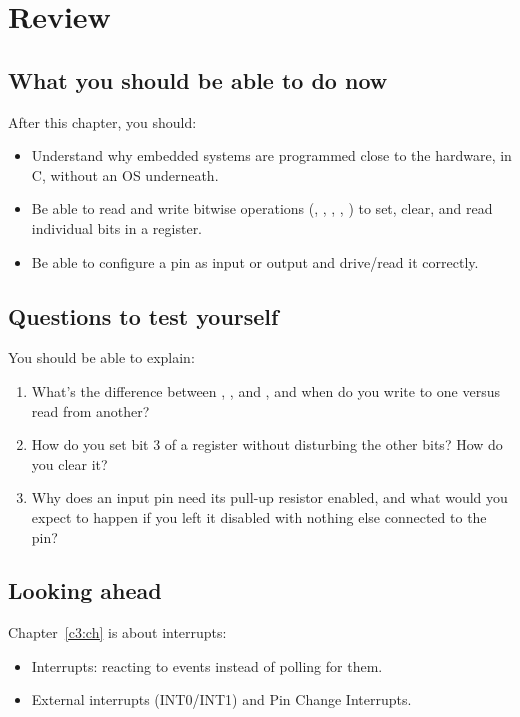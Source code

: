 
\section{Review}
\label{c2:sec:review}

\subsection*{What you should be able to do now}
After this chapter, you should:
\begin{itemize}
  \item Understand why embedded systems are programmed close to the hardware, in C, without an OS
    underneath.
  \item Be able to read and write bitwise operations (\code{|}, \code{&}, \code{~}, \code{<<},
    \code{>>}) to set, clear, and read individual bits in a register.
  \item Be able to configure a pin as input or output and drive/read it correctly.
\end{itemize}

\subsection*{Questions to test yourself}
You should be able to explain:
\begin{enumerate}
  \item What's the difference between , , and , and when do you
    write to one versus read from another?
  \item How do you set bit 3 of a register without disturbing the other bits? How do you clear it?
  \item Why does an input pin need its pull-up resistor enabled, and what would you expect to happen
    if you left it disabled with nothing else connected to the pin?
\end{enumerate}

\subsection*{Looking ahead}
Chapter~\ref{c3:ch} is about interrupts:
\begin{itemize}
  \item Interrupts: reacting to events instead of polling for them.
  \item External interrupts (INT0/INT1) and Pin Change Interrupts.
\end{itemize}

